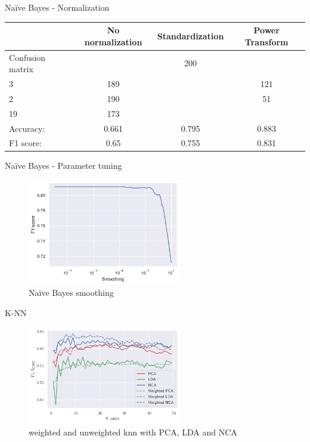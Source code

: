 \documentclass[aspectratio=169]{beamer}
\begin{document}
\begin{frame}{Na\"ive Bayes - Normalization}
\begin{table}[H]
\centering
\begin{tabular}{lccc}
\toprule
    & No normalization & Standardization & Power Transform \\
    \midrule
    Confusion matrix &
    \( \begin{bmatrix} 208 & 200 \\ 3 & 189 \end{bmatrix} \) &
    \( \begin{bmatrix} 287 & 121 \\ 2 & 190\end{bmatrix} \) &
    \( \begin{bmatrix} 357 & 51 \\ 19 & 173\end{bmatrix} \)
    \\
    \addlinespace[0.5em]
    Accuracy: & 0.661 & 0.795 & 0.883 \\
    F1 score: & 0.65 & 0.755 & 0.831 \\
    \bottomrule
\end{tabular}
\end{table}
\end{frame}

\begin{frame}{Na\"ive Bayes - Parameter tuning}
\begin{figure}[H]
    \centering
    \includegraphics[width=0.6\textwidth]{naive_bayes_smoothing_cv.pdf}
    \caption{Na\"ive Bayes smoothing}%
    \label{fig:naive_bayes_smoothing_cv}
\end{figure}
\end{frame}

\begin{frame}{K-NN}
\begin{figure}[H]
    \centering
    \includegraphics[width=0.6\textwidth]{knn}
    \caption{weighted and unweighted knn with PCA, LDA and NCA}%
    \label{fig:knn_pca_lda_nca}
\end{figure}
\end{frame}
\end{document}
